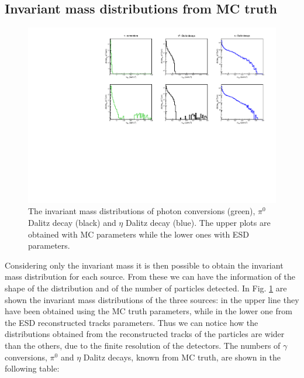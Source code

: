 \documentclass[a4paper,twocolumn,gsifonts,twoside]{gsipaper}
\begin{document}
\subsection{Invariant mass distributions from MC truth}
\begin{figure}[tb]
\begin{center}
\advance\leftskip-0.5cm
\includegraphics[scale = 0.8]{sources2.pdf}
\caption{The invariant mass distributions of photon conversions (green), $\pi^{0}$ Dalitz decay (black) and $\eta$ Dalitz decay (blue). 
The upper plots are obtained with MC parameters while the lower ones with ESD parameters.}
\label{invariant_mass}
\end{center}
\end{figure}

Considering only the invariant mass it is then possible to obtain the invariant mass distribution for each source. From these we 
can have the information of the shape of the distribution and of the number of particles detected. In Fig. \ref{invariant_mass} are shown 
the invariant mass distributions of the three sources: in the upper line they have been obtained using the MC truth parameters, while
in the lower one from the ESD reconstructed tracks parameters. 
Thus we can notice how the distributions obtained from the reconstructed tracks of the particles are wider than the others,
due to the finite resolution of the detectors.
The numbers of $\gamma$ conversions, $\pi^{0}$ and $\eta$ Dalitz decays, known from MC truth, are shown in the following table:
\end{document}

